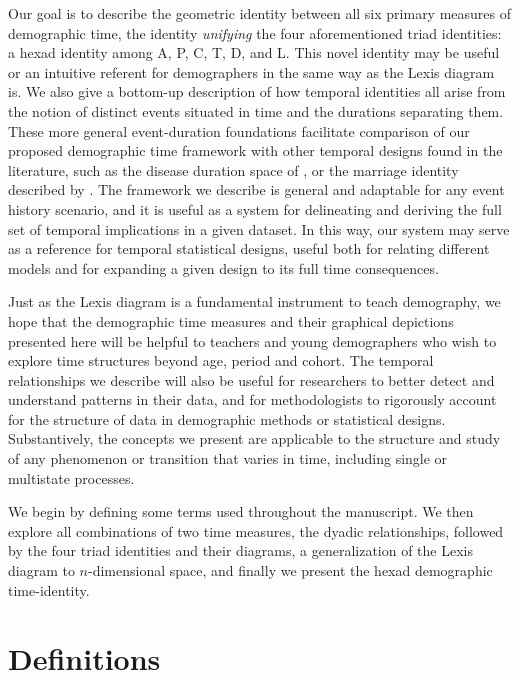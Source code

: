 \documentclass[12pt,oneside,a4paper]{article} %
\theoremstyle{definition}
\begin{document}
Our goal is to describe the geometric identity between all
six primary measures of demographic time, the identity \emph{unifying} the four
aforementioned triad identities: a hexad identity among A, P, C, T, D, and L.
This novel identity may be useful or an intuitive referent for demographers in
the same way as the Lexis diagram is. We also give a bottom-up description of
how temporal identities all arise from the notion of distinct events situated in time and the durations separating them. These more general event-duration foundations facilitate comparison of our proposed demographic time framework with other temporal designs found in the literature, such as the disease duration space of \citet{brinks2014lexis},
or the marriage identity described by \citet{lexis1875einleitung}.
The framework we describe is general and adaptable for any event history
scenario, and it is useful as a system for delineating and deriving the full
set of temporal implications in a given dataset. In this way, our system may
serve as a reference for temporal statistical designs, useful both for relating
different models and for expanding a given design to its full time
consequences. 

Just as the Lexis diagram is a fundamental instrument to
teach demography, we hope that the demographic time measures and
their graphical depictions presented here will be helpful to teachers and
young demographers who wish to explore time structures beyond age, period and
cohort. The temporal relationships we describe will also be useful for researchers to better detect and understand patterns in their data, and for
methodologists to rigorously account for the structure of data in demographic
methods or statistical designs. Substantively, the concepts we present
are applicable to the structure and study of any phenomenon or transition that
varies in time, including single or multistate processes. 

We begin by defining some terms used throughout the manuscript.
We then explore all combinations of two time measures, the dyadic relationships,
followed by the four triad identities and their diagrams, a generalization of
the Lexis diagram to $n$-dimensional space, and finally we present the hexad
demographic time-identity.

\section{Definitions}
\end{document}
